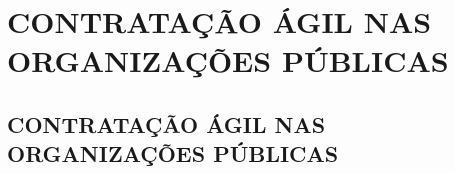 \part{CONTRATAÇÃO ÁGIL NAS ORGANIZAÇÕES PÚBLICAS}

\chapter[Contratação Ágil nas Organizações Públicas]{CONTRATAÇÃO ÁGIL NAS ORGANIZAÇÕES PÚBLICAS}